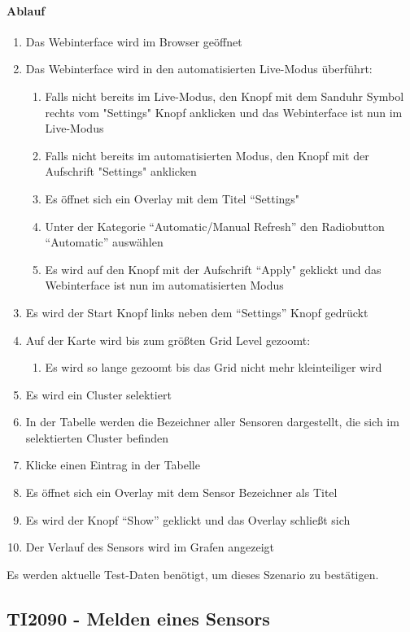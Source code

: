 \paragraph{Ablauf}
\begin{enumerate}
\item Das Webinterface wird im Browser geöffnet
\item Das Webinterface wird in den automatisierten Live-Modus überführt:
\begin{enumerate}
\item Falls nicht bereits im Live-Modus, den Knopf mit dem Sanduhr Symbol rechts vom "Settings" Knopf anklicken und das Webinterface ist nun im Live-Modus
\item Falls nicht bereits im automatisierten Modus, den Knopf mit der Aufschrift "Settings" anklicken
\item Es öffnet sich ein Overlay mit dem Titel ``Settings"
\item Unter der Kategorie ``Automatic/Manual Refresh'' den Radiobutton ``Automatic'' auswählen
\item Es wird auf den Knopf mit der Aufschrift ``Apply" geklickt und das Webinterface ist nun im automatisierten Modus
\end{enumerate} 
\item Es wird der Start Knopf links neben dem ``Settings'' Knopf gedrückt
\item Auf der Karte wird bis zum größten Grid Level gezoomt:
\begin{enumerate}
\item Es wird so lange gezoomt bis das Grid nicht mehr kleinteiliger wird
\end{enumerate}
\item Es wird ein Cluster selektiert
\item In der Tabelle werden die Bezeichner aller Sensoren dargestellt, die sich im selektierten Cluster befinden
\item Klicke einen Eintrag in der Tabelle
\item Es öffnet sich ein Overlay mit dem Sensor Bezeichner als Titel
\item Es wird der Knopf ``Show'' geklickt und das Overlay schließt sich
\item Der Verlauf des Sensors wird im Grafen angezeigt
\end{enumerate}
\szenarioBad
Es werden aktuelle Test-Daten benötigt, um dieses Szenario zu bestätigen.

\subsection{TI2090 - Melden eines Sensors}
